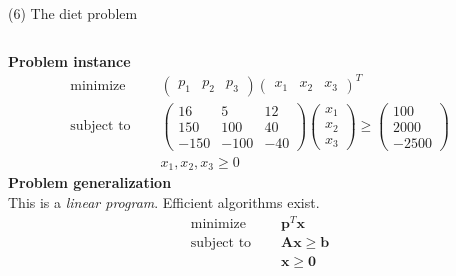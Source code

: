 \documentclass[11pt, aspectratio=149]{beamer}
\theoremstyle{plain}
\begin{document}
\begin{frame}[fragile, t]{(6) The diet problem}
	\begin{columns}
		\begin{column}{0.999\textwidth}
			\textbf{Problem instance}
			\small
			\begin{align*}
			\text{minimize } \quad & 
			\begin{pmatrix}
			p_1 & p_2 & p_3 
			\end{pmatrix}
			 \begin{pmatrix}
			 x_1 & x_2 & x_3 
			 \end{pmatrix}^{T}  \\
			\text{subject to } \quad & \begin{pmatrix}
			16 & 5 & 12 \\ 
			150 & 100 & 40\\ 
			-150 & -100 & -40
			\end{pmatrix}
			\begin{pmatrix}
			x_1  \\ 
			x_2 \\ 
			x_3
			\end{pmatrix}
			\geq 
			\begin{pmatrix}
			100  \\ 
			2000 \\ 
			-2500
			\end{pmatrix} \\
			\quad & x_1, x_2, x_3 \geq 0
			\end{align*}
			\normalsize
			\textbf{Problem generalization}
			\\
			\vspace*{0.5em}
			This is a \emph{linear program}. 
			Efficient algorithms exist.
			\begin{align*}
			\text{minimize } \quad & \mathbf{p}^T \mathbf{x}  \\
			\text{subject to } \quad & \mathbf{A} \mathbf{x} \geq \mathbf{b} \\
			\quad & \mathbf{x} \geq \mathbf{0}
			\end{align*}
			
		\end{column}
	\end{columns}
\end{frame}

\end{document}
